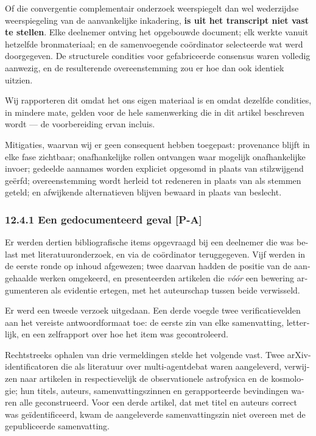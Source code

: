 \begin{dutch}
Of die convergentie complementair onderzoek weerspiegelt dan wel wederzijdse weerspiegeling van de aanvankelijke inkadering, \textbf{is uit het transcript niet vast te stellen}. Elke deelnemer ontving het opgebouwde document; elk werkte vanuit hetzelfde bronmateriaal; en de samenvoegende coördinator selecteerde wat werd doorgegeven. De structurele condities voor gefabriceerde consensus waren volledig aanwezig, en de resulterende overeenstemming zou er hoe dan ook identiek uitzien.

Wij rapporteren dit omdat het ons eigen materiaal is en omdat dezelfde condities, in mindere mate, gelden voor de hele samenwerking die in dit artikel beschreven wordt — de voorbereiding ervan incluis.

Mitigaties, waarvan wij er geen consequent hebben toegepast: provenance blijft in elke fase zichtbaar; onafhankelijke rollen ontvangen waar mogelijk onafhankelijke invoer; gedeelde aannames worden expliciet opgesomd in plaats van stilzwijgend geërfd; overeenstemming wordt herleid tot redeneren in plaats van als stemmen geteld; en afwijkende alternatieven blijven bewaard in plaats van beslecht.


\subsubsection*{12.4.1 Een gedocumenteerd geval \textbf{[P-A]}}
\label{sec:nl:12.4.1}

Er werden dertien bibliografische items opgevraagd bij een deelnemer die was belast met literatuuronderzoek, en via de coördinator teruggegeven. Vijf werden in de eerste ronde op inhoud afgewezen; twee daarvan hadden de positie van de aangehaalde werken omgekeerd, en presenteerden artikelen die \emph{vóór} een bewering argumenteren als evidentie ertegen, met het auteurschap tussen beide verwisseld.

Er werd een tweede verzoek uitgedaan. Een derde voegde twee verificatievelden aan het vereiste antwoordformaat toe: de eerste zin van elke samenvatting, letterlijk, en een zelfrapport over hoe het item was gecontroleerd.

Rechtstreeks ophalen van drie vermeldingen stelde het volgende vast. Twee arXiv-identificatoren die als literatuur over multi-agentdebat waren aangeleverd, verwijzen naar artikelen in respectievelijk de observationele astrofysica en de kosmologie; hun titels, auteurs, samenvattingszinnen en gerapporteerde bevindingen waren alle geconstrueerd. Voor een derde artikel, dat met titel en auteurs correct was geïdentificeerd, kwam de aangeleverde samenvattingszin niet overeen met de gepubliceerde samenvatting.


\end{dutch}
